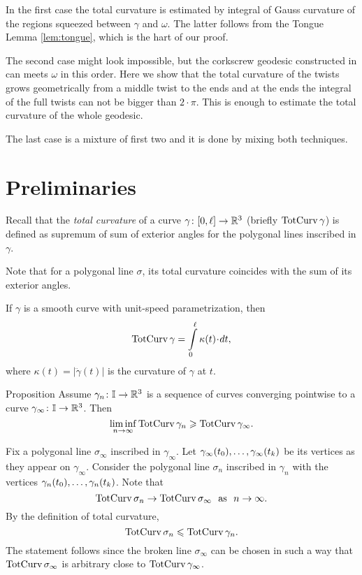 \documentclass[a4paper,10pt]{amsart}
\begin{document}
In the first case the total curvature is estimated by integral of Gauss curvature of the regions squeezed between $\gamma$ and $\omega$.
The latter follows from the Tongue Lemma \ref{lem:tongue},
which is the hart of our proof.

The second case might look impossible, 
but the corkscrew geodesic constructed in \cite{BKZ} can meets $\omega$ in this order.
Here we show that the total curvature of the twists grows geometrically from a middle twist to the ends and at the ends 
the integral of the full twists can not be bigger than $2\cdot\pi$.
This is enough to estimate the total curvature of the whole geodesic.

The last case is a mixture of first two and it is done by mixing both techniques.

\section{Preliminaries}

Recall that the \emph{total curvature} of a curve $\gamma\colon[0,\ell]\to \mathbb{R}^3$ 
(briefly $\mathop{\rm TotCurv}\nolimits\gamma$)
is defined as supremum of sum of exterior angles 
for the polygonal lines inscribed in $\gamma$.

Note that for a polygonal line $\sigma$, 
its total curvature coincides with the sum of its exterior angles.

If $\gamma$ is a smooth curve with unit-speed parametrization, 
then 
\[\tc\gamma=\int\limits_0^\ell \kappa(t)\cdot dt,\]
where $\kappa(t)=|\ddot\gamma(t)|$ is the curvature of $\gamma$ at $t$.

\begin{thm}{Proposition}\label{prop:semicontinuity}
Assume $\gamma_n\colon\mathbb{I}\to\mathbb{R}^3$ is a sequence of curves  converging pointwise to a curve $\gamma_\infty\colon\mathbb{I}\to\mathbb{R}^3$.
Then 
\[\liminf_{n\to\infty}\mathop{\rm TotCurv}\nolimits\gamma_n\geqslant \mathop{\rm TotCurv}\nolimits\gamma_\infty.\]
\end{thm}


Fix a polygonal line $\sigma_\infty$ inscribed in $\gamma_\infty$.
Let $\gamma_\infty(t_0),\zz\dots,\gamma_\infty(t_k)$
be its vertices 
as they appear on $\gamma_\infty$.
Consider the polygonal line $\sigma_n$ inscribed in $\gamma_n$ with the vertices 
$\gamma_n(t_0),\zz\dots,\gamma_n(t_k)$.
Note that 
\[\tc\sigma_n\to\tc\sigma_\infty\ \ \text{as}\ \ n\to\infty.\]
By the definition of total curvature, 
\[\mathop{\rm TotCurv}\nolimits\sigma_n\leqslant\mathop{\rm TotCurv}\nolimits\gamma_n.\]
The statement follows since the broken line $\sigma_\infty$ can be chosen in such a way that 
$\mathop{\rm TotCurv}\nolimits\sigma_\infty$ is arbitrary close to $\mathop{\rm TotCurv}\nolimits\gamma_\infty$.
\qeds
\end{document}
